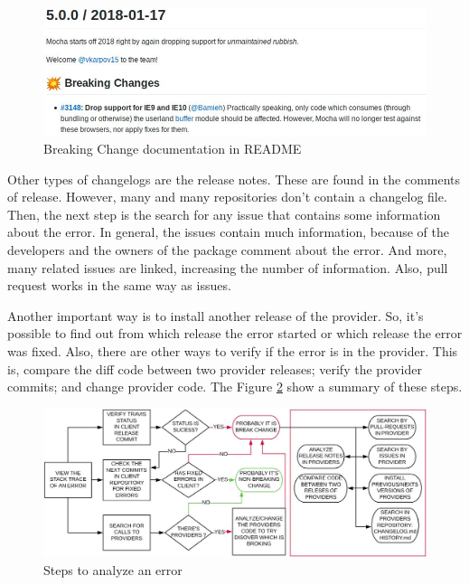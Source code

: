 \begin{figure}
    \centering
    \includegraphics[scale=0.55]{figuras/bc_documentation.jpeg}
    \caption{Breaking Change documentation in README}
    \label{fig:bc_documentation}
\end{figure}{}

Other types of changelogs are the release notes. These are found in the comments of release. However, many and many repositories don’t contain a changelog file. Then, the next step is the search for any issue that contains some information about the error. In general, the issues contain much information, because of the developers and the owners of the package comment about the error. And more, many related issues are linked, increasing the number of information. Also, pull request works in the same way as issues.

Another important way is to install another release of the provider. So, it's possible to find out from which release the error started or which release the error was fixed. Also, there are other ways to verify if the error is in the provider. This is, compare the diff code between two provider releases; verify the provider commits; and change provider code.
The Figure \ref{fig:step_analyze} show a summary of these steps.

\begin{figure}
    \centering
    \includegraphics[scale=0.35]{figuras/step_analyze.jpeg}
    \caption{Steps to analyze an error}
    \label{fig:step_analyze}
\end{figure}


